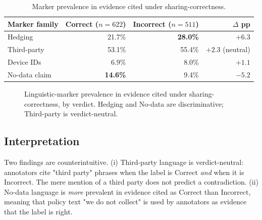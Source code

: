 \documentclass[11pt,a4paper]{article}
\begin{document}
\begin{table}[t]
\centering\small
\caption{Marker prevalence in evidence cited under sharing-correctness.}
\label{tab:disc}
\begin{tabular}{lrrr}
\toprule
Marker family & Correct ($n=622$) & Incorrect ($n=511$) & $\Delta$ pp \\
\midrule
Hedging       & 21.7\% & \textbf{28.0\%} & $+6.3$ \\
Third-party   & 53.1\% & 55.4\% & $+2.3$ (neutral) \\
Device IDs    &  6.9\% &  8.0\% & $+1.1$ \\
No-data claim & \textbf{14.6\%} &  9.4\% & $-5.2$ \\
\bottomrule
\end{tabular}
\end{table}

\begin{figure}[t]
\centering
{}
\caption{Linguistic-marker prevalence in evidence cited under
sharing-correctness, by verdict. Hedging and No-data are
discriminative; Third-party is verdict-neutral.}
\label{fig:disc}
\end{figure}

\subsection{Interpretation}
Two findings are counterintuitive.
(i) Third-party language is verdict-neutral: annotators cite "third party"
phrases when the label is Correct \emph{and} when it is Incorrect. The
mere mention of a third party does not predict a contradiction.
(ii) No-data language is \emph{more} prevalent in evidence cited as
Correct than Incorrect, meaning that policy text "we do not collect"
is used by annotators as evidence that the label is right.
\end{document}
